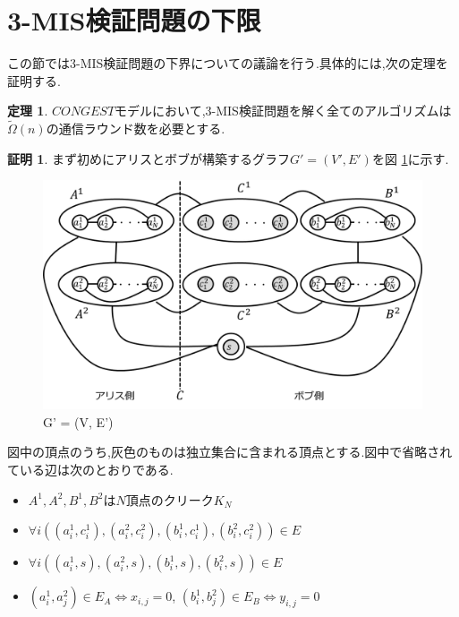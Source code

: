 \documentclass[12pt]{thesis}
\theoremstyle{definition}
\newtheorem{theorem}{定理}[chapter]
\newtheorem*{prf*}{証明}
\begin{document}
\section{3-MIS検証問題の下限}
この節では3-MIS検証問題の下界についての議論を行う.具体的には,次の定理を証明する.
\begin{theorem}
$CONGEST$モデルにおいて,3-MIS検証問題を解く全てのアルゴリズムは$\tilde{\Omega} (n)$の通信ラウンド数を必要とする.
\end{theorem}

\begin{prf*}
まず初めにアリスとボブが構築するグラフ$G' = (V', E')$を図 \ref{3MIS}に示す. 

\begin{figure}[ht]
\begin{center}
\includegraphics[width=120mm]{3MIS.png}
\end{center}
\caption{G' = (V, E')}
\label{3MIS}
\end{figure}

図中の頂点のうち,灰色のものは独立集合に含まれる頂点とする.図中で省略されている辺は次のとおりである.
\begin{itemize}
\item $A^{1}, A^{2}, B^{1}, B^{2}$は$N$頂点のクリーク$K_{N}$
\item $\forall i((a_{i}^{1}, c_{i}^{1}), (a_{i}^{2}, c_{i}^{2}), (b_{i}^{1}, c_{i}^{1}), (b_{i}^{2}, c_{i}^{2})) \in E$
\item $\forall i((a_{i}^{1}, s), (a_{i}^{2}, s), (b_{i}^{1}, s), (b_{i}^{2}, s)) \in E$
\item $(a_{i}^{1}, a_{j}^{2}) \in E_{A} \Leftrightarrow x_{i, j} = 0$, $(b_{i}^{1}, b_{j}^{2}) \in E_{B} \Leftrightarrow y_{i, j} = 0$
\end{itemize}


\end{prf*}
\end{document}
